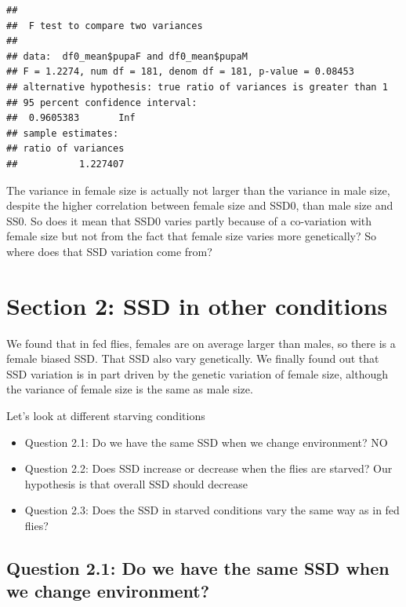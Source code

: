 \documentclass[
]{article}
\providecommand{\tightlist}{%
  \setlength{\itemsep}{0pt}\setlength{\parskip}{0pt}}
\begin{document}
\begin{verbatim}
## 
##  F test to compare two variances
## 
## data:  df0_mean$pupaF and df0_mean$pupaM
## F = 1.2274, num df = 181, denom df = 181, p-value = 0.08453
## alternative hypothesis: true ratio of variances is greater than 1
## 95 percent confidence interval:
##  0.9605383       Inf
## sample estimates:
## ratio of variances 
##           1.227407
\end{verbatim}

The variance in female size is actually not larger than the variance in
male size, despite the higher correlation between female size and SSD0,
than male size and SS0. So does it mean that SSD0 varies partly because
of a co-variation with female size but not from the fact that female
size varies more genetically? So where does that SSD variation come
from?

\hypertarget{section-2-ssd-in-other-conditions}{%
\section{Section 2: SSD in other
conditions}\label{section-2-ssd-in-other-conditions}}

We found that in fed flies, females are on average larger than males, so
there is a female biased SSD. That SSD also vary genetically. We finally
found out that SSD variation is in part driven by the genetic variation
of female size, although the variance of female size is the same as male
size.

Let's look at different starving conditions

\begin{itemize}
\tightlist
\item
  Question 2.1: Do we have the same SSD when we change environment? NO
\item
  Question 2.2: Does SSD increase or decrease when the flies are
  starved? Our hypothesis is that overall SSD should decrease
\item
  Question 2.3: Does the SSD in starved conditions vary the same way as
  in fed flies?
\end{itemize}

\hypertarget{question-2.1-do-we-have-the-same-ssd-when-we-change-environment}{%
\subsection{Question 2.1: Do we have the same SSD when we change
environment?}\label{question-2.1-do-we-have-the-same-ssd-when-we-change-environment}}
\end{document}
